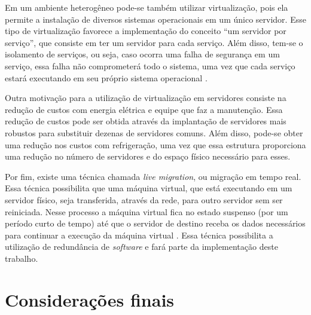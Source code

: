
Em um ambiente heterogêneo pode-se também utilizar virtualização, pois ela permite a instalação de diversos sistemas operacionais em um 
único servidor. Esse tipo de virtualização favorece a implementação do conceito ``um servidor por serviço'', que consiste em ter um servidor 
para cada serviço. Além disso, tem-se o isolamento de serviços, ou seja, caso ocorra uma falha de segurança em um serviço, essa falha não 
comprometerá todo o sistema, uma vez que cada serviço estará executando em seu próprio sistema operacional \cite{carissimi2008}.

Outra motivação para a utilização de virtualização em servidores consiste na redução de custos com energia elétrica e equipe que faz a manutenção. 
Essa redução de custos pode ser obtida através da implantação de servidores mais robustos para substituir dezenas de servidores comuns. 
Além disso, pode-se obter uma redução nos custos com refrigeração, uma vez que essa estrutura proporciona uma redução no número de servidores
e do espaço físico necessário para esses.

Por fim, existe uma técnica chamada \textit{live migration}, ou migração em tempo real. Essa técnica possibilita que uma máquina virtual, 
que está executando em um servidor físico, seja transferida, através da rede, para outro servidor sem ser reiniciada. Nesse processo a máquina 
virtual fica no estado suspenso (por um período curto de tempo) até que o servidor de destino receba os dados necessários para continuar 
a execução da máquina virtual \cite{silva2009}. Essa técnica possibilita a utilização de redundância de \textit{software} e fará parte da 
implementação deste trabalho.

\section{Considerações finais}

